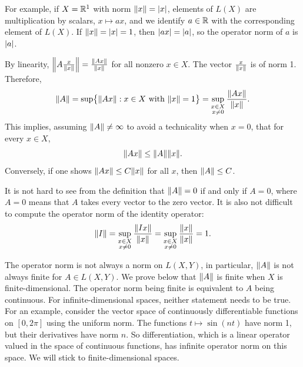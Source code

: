 For example, if $X={\mathbb{R}}^1$ with norm $\lVert {x} \rVert=\lvert {x} \rvert$, elements of $L(X)$
are multiplication by scalars, $x \mapsto ax$, and we identify $a \in {\mathbb{R}}$ with the
corresponding element of $L(X)$.  If $\lVert {x} \rVert=\lvert {x} \rvert=1$, then $\lvert {a x} \rvert = \lvert {a} \rvert$, so
the operator norm of $a$ is $\lvert {a} \rvert$.

By linearity,
$\left\lVert {A \frac{x}{\lVert {x} \rVert}} \right\rVert = \frac{\lVert {Ax} \rVert}{\lVert {x} \rVert}$
for all nonzero $x \in X$.
The vector $\frac{x}{\lVert {x} \rVert}$ is of norm 1.
Therefore,
\begin{equation*}
\lVert {A} \rVert =
\sup \bigl\{ \lVert {Ax} \rVert : x \in X \text{ with } \lVert {x} \rVert = 1 \bigr\}
=
\sup_{\substack{x \in X\\x\neq 0}} \frac{\lVert {Ax} \rVert}{\lVert {x} \rVert} .
\end{equation*}
This implies, assuming $\lVert {A} \rVert\not= \infty$ to avoid a technicality when $x=0$,
that for every $x \in X$,
\begin{equation*}
\snorm{Ax} \leq \snorm{A}  \snorm{x} .
\avoidbreak
\end{equation*}
Conversely, if one shows $\lVert {Ax} \rVert \leq C \lVert {x} \rVert$ for all $x$,
then $\lVert {A} \rVert \leq C$.

It is not hard to see from the definition that $\lVert {A} \rVert = 0$ if and
only if $A = 0$, where $A=0$ means that $A$ takes every vector to the zero vector.
It is also not difficult to compute the operator norm of the identity operator:
\begin{equation*}
\lVert {I} \rVert =
\sup_{\substack{x \in X\\x\neq 0}} \frac{\lVert {Ix} \rVert}{\lVert {x} \rVert} 
=
\sup_{\substack{x \in X\\x\neq 0}} \frac{\lVert {x} \rVert}{\lVert {x} \rVert} 
= 1.
\end{equation*}

The operator norm is not always a norm on $L(X,Y)$, in particular,
$\lVert {A} \rVert$ is not always finite for $A \in L(X,Y)$.
We prove below that $\lVert {A} \rVert$ is finite when $X$ is finite-dimensional.
The operator norm being finite is equivalent to $A$ being continuous.
For infinite-dimensional spaces, neither statement needs to be true.
For an example,
consider the vector space of continuously differentiable functions on
$[0,2\pi]$ using the uniform norm.  The functions
$t \mapsto \sin(n t)$ have norm 1, but their derivatives have norm $n$.  So
differentiation, which is a linear operator valued in the space of
continuous functions, has infinite operator norm on this space.
We will stick to finite-dimensional spaces.

